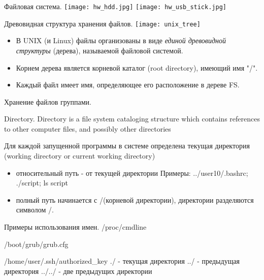 \begin{frame}{Файловая система.}
\texttt{[image: hw\_hdd.jpg]} 
\texttt{[image: hw\_usb\_stick.jpg]} 
\end{frame}

\begin{frame}{Древовидная структура хранения файлов.}
\texttt{[image: unix\_tree]} 
  \begin{itemize}
    \item В UNIX (и Linux) файлы организованы в виде \emph{единой древовидной структуры} (дерева), называемой \alert{файловой системой}.
    \item Корнем дерева является \alert{корневой каталог} (root directory), имеющий имя \alert{"/"}.
    \item Каждый файл имеет \alert{имя}, определяющее его расположение в дереве FS.
  \end{itemize}
\end{frame}



\begin{frame}[fragile]{Хранение файлов группами.}
      \begin{block}{Directory.}
Directory is a file system cataloging structure which contains references to other computer \alert{files}, and possibly other \alert{directories}
      \end{block}
 Для каждой запущенной программы в системе определена \alert{текущая директория} (working directory or current working directory) 
  \begin{itemize}
    \item \alert{относительный путь} - от текущей директории \newline
      Примеры: ../user10/.bashrc; ./script; ls script
    \item \alert{полный путь} начинается с \alert{/}(корневой директории), директории разделяются символом \alert{/}. \newline
  \end{itemize}
\end{frame}

\begin{frame}{Примеры использования имен.}
        /proc/cmdline

        /boot/grub/grub.cfg

        /home/user/.ssh/authorized\_key
        \alert{./} - текущая директория
        \alert{../} - предыдущая директория
        \alert{../../} - две предыдущих директории
\end{frame}

